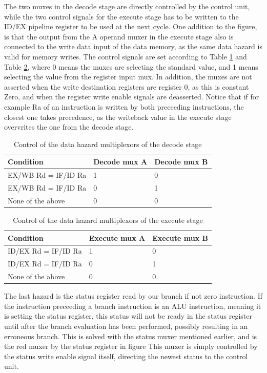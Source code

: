 \documentclass[11pt]{report}
\begin{document}
The two muxes in the
decode stage are directly controlled by the control unit, while the two control signals 
for the execute stage has to be written to the ID/EX pipeline register to be used at the
next cycle. One addition to the figure, is that the output from the A operand muxer in 
the execute stage also is connected to the write data input of the data memory, as the
same data hazard is valid for memory writes. The control signals are set according to
Table \ref{tab:demuxes} and Table \ref{tab:exmuxes}, 
where 0 means the muxes are selecting the standard value, and 1 means selecting the 
value from the register input mux. In addition, the muxes are not asserted when 
the write destination registers are register 0, 
as this is constant Zero, and when the register write enable signals are deasserted.
Notice that if for example Ra of an instruction is written by both preceeding 
instructions, the closest one takes precedence, as the writeback value in the
execute stage overvrites the one from the decode stage.

\begin{table}[htbp]
  \centering
  \begin{tabular}{|l|l|l|}
    \hline
    Condition&Decode mux A&Decode mux B \\
    \hline
    EX/WB Rd = IF/ID Ra	&1	& 0\\
    EX/WB Rd = IF/ID Ra	&0	& 1\\
    None of the above	&0	& 0\\
    \hline
    
  \end{tabular}
  \caption{Control of the data hazard multiplexors of the decode stage}
  \label{tab:demuxes}
\end{table}

\begin{table}[htbp]
  \centering
  \begin{tabular}{|l|l|l|}
    \hline
    Condition&Execute mux A&Execute mux B \\
    \hline
    ID/EX Rd = IF/ID Ra	&1	& 0\\
    ID/EX Rd = IF/ID Ra	&0	& 1\\
    None of the above	&0	& 0\\
    \hline
    
  \end{tabular}
  \caption{Control of the data hazard multiplexors of the execute stage}
  \label{tab:exmuxes}
\end{table}
The last hazard is the status register read by our branch if not zero instruction.
If the instruction preceeding a branch instruction is an ALU instruction, meaning it
is setting the status register, this status will not be ready in the status register
until after the branch evaluation has been performed, possibly resulting in an
erroneous branch. This is solved with the status muxer mentioned earlier, and is the 
red muxer by the status register in figure %
This muxer is simply controlled by the status write enable signal itself, directing the
newest status to the control unit.
\end{document}
